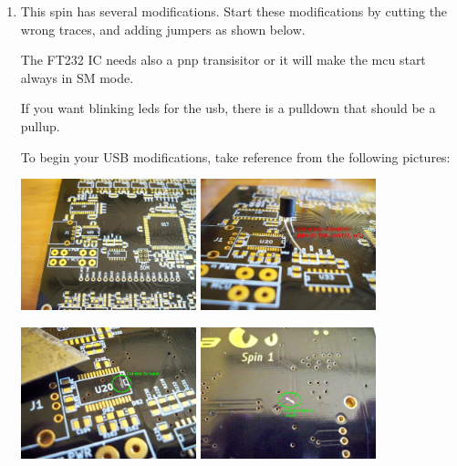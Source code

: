 \documentclass[12pt,a4paper,titlepage]{article}
\begin{document}
\begin{enumerate}
\item This spin has several modifications. Start these modifications by cutting the wrong traces, and adding jumpers as shown below.

The FT232 IC needs also a pnp transisitor or it will make the mcu start always in SM mode.

If you want blinking leds for the usb, there is a pulldown that should be a pullup.

To begin your USB modifications, take reference from the following pictures:

\includegraphics[width = 0.4\textwidth]{images/step1.jpg}
\includegraphics[width = 0.4\textwidth]{images/step2.jpg}

\includegraphics[width = 0.4\textwidth]{images/step4.png}
\includegraphics[width = 0.4\textwidth]{images/step5.png}


\end{enumerate}
\end{document}
